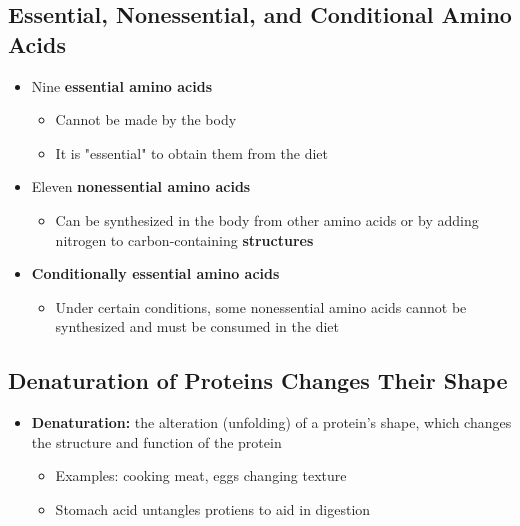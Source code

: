 \documentclass[12pt]{article}
\begin{document}
        \subsection{Essential, Nonessential, and Conditional Amino Acids}
            \begin{itemize}
                \item Nine \textbf{essential amino acids}
                    \begin{itemize}
                        \item Cannot be made by the body
                        \item It is "essential" to obtain them from the diet
                    \end{itemize}
                \item Eleven \textbf{nonessential amino acids}
                    \begin{itemize}
                        \item Can be synthesized in the body from other amino acids or by adding nitrogen to carbon-containing \textbf{structures}
                    \end{itemize}
                \item \textbf{Conditionally essential amino acids}
                    \begin{itemize}
                        \item Under certain conditions, some nonessential amino acids cannot be synthesized and must be consumed in the diet
                    \end{itemize}
            \end{itemize}

        \subsection{Denaturation of Proteins Changes Their Shape}
            \begin{itemize}
                \item \textbf{Denaturation:} the alteration (unfolding) of a protein's shape, which changes the structure and function of the protein
                    \begin{itemize}
                        \item Examples: cooking meat, eggs changing texture
                        \item Stomach acid untangles protiens to aid in digestion
                    \end{itemize}
            \end{itemize}
        
\end{document}

